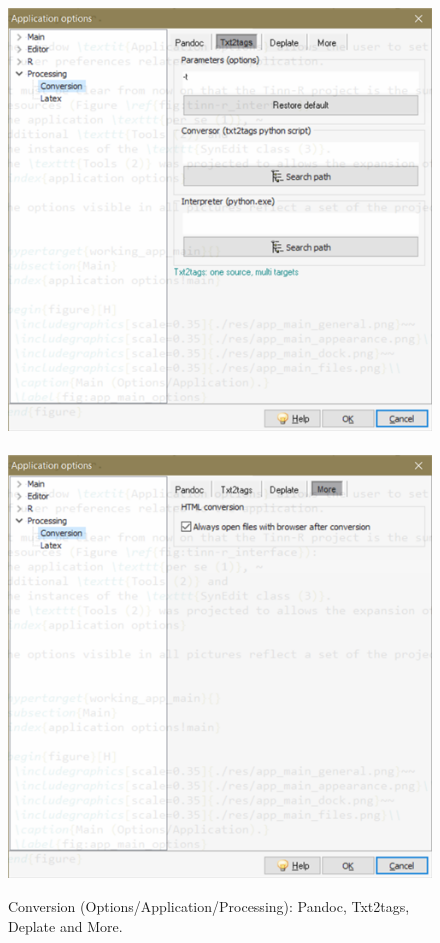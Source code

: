 \begin{figure}[h!]
  \includegraphics[scale=0.6]{./res/app_processing_conversion_txt2tags.png}~~
  \includegraphics[scale=0.6]{./res/app_processing_conversion_more.png}\\
  \caption{Conversion (Options/Application/Processing): Pandoc, Txt2tags, Deplate and More.}
  \label{fig:app_processing_conversion_options}
\end{figure}

